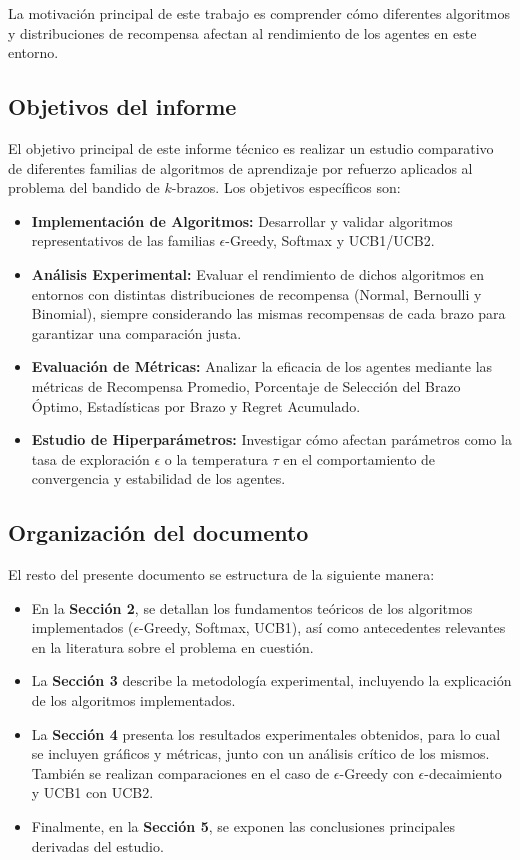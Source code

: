 La motivación principal de este trabajo es comprender cómo diferentes algoritmos y 
distribuciones de recompensa afectan al rendimiento de los agentes en este entorno.



\subsection{Objetivos del informe}
El objetivo principal de este informe técnico es realizar un estudio comparativo de 
diferentes familias de algoritmos de aprendizaje por refuerzo aplicados al 
problema del bandido de $k$-brazos. Los objetivos específicos son:

\begin{itemize}
    \item \textbf{Implementación de Algoritmos:} Desarrollar y validar algoritmos representativos 
    de las familias $\epsilon$-Greedy, Softmax y UCB1/UCB2.
    \item \textbf{Análisis Experimental:} Evaluar el rendimiento de dichos algoritmos en entornos 
    con distintas distribuciones de recompensa (Normal, Bernoulli y Binomial), siempre 
    considerando las mismas recompensas de cada brazo para garantizar una comparación justa.
    \item \textbf{Evaluación de Métricas:} Analizar la eficacia de los agentes mediante las métricas de 
    Recompensa Promedio, Porcentaje de Selección del Brazo Óptimo, Estadísticas por Brazo y Regret Acumulado.
    \item \textbf{Estudio de Hiperparámetros:} Investigar cómo afectan parámetros como la tasa 
    de exploración $\epsilon$ o la temperatura $\tau$ en el comportamiento de convergencia y estabilidad 
    de los agentes.
\end{itemize}

\subsection{Organización del documento}
El resto del presente documento se estructura de la siguiente manera:

\begin{itemize}
    \item En la \textbf{Sección 2}, se detallan los fundamentos teóricos de los algoritmos 
    implementados ($\epsilon$-Greedy, Softmax, UCB1), así como antecedentes relevantes en la literatura 
    sobre el problema en cuestión.
    \item La \textbf{Sección 3} describe la metodología experimental, incluyendo la explicación 
    de los algoritmos implementados.
    \item La \textbf{Sección 4} presenta los resultados experimentales obtenidos, para lo cual 
    se incluyen gráficos y métricas, junto con un análisis crítico de los mismos. También se realizan comparaciones
    en el caso de $\epsilon$-Greedy con $\epsilon$-decaimiento y UCB1 con UCB2.
    \item Finalmente, en la \textbf{Sección 5}, se exponen las conclusiones principales derivadas del estudio.
\end{itemize}

